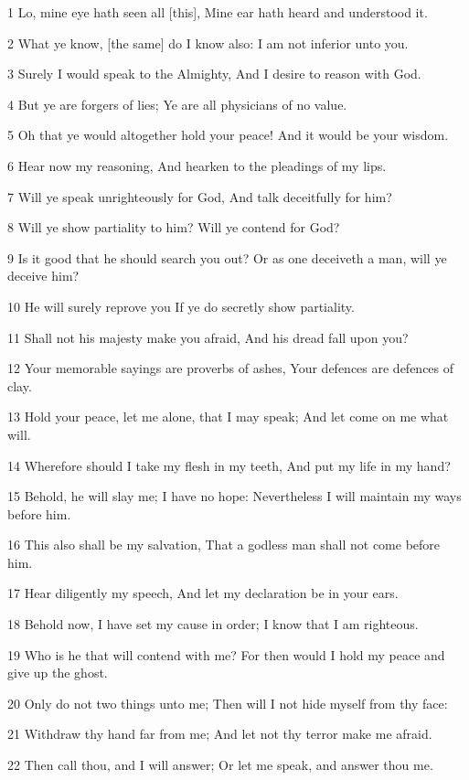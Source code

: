 \par 1 Lo, mine eye hath seen all [this], Mine ear hath heard and understood it.
\par 2 What ye know, [the same] do I know also: I am not inferior unto you.
\par 3 Surely I would speak to the Almighty, And I desire to reason with God.
\par 4 But ye are forgers of lies; Ye are all physicians of no value.
\par 5 Oh that ye would altogether hold your peace! And it would be your wisdom.
\par 6 Hear now my reasoning, And hearken to the pleadings of my lips.
\par 7 Will ye speak unrighteously for God, And talk deceitfully for him?
\par 8 Will ye show partiality to him? Will ye contend for God?
\par 9 Is it good that he should search you out? Or as one deceiveth a man, will ye deceive him?
\par 10 He will surely reprove you If ye do secretly show partiality.
\par 11 Shall not his majesty make you afraid, And his dread fall upon you?
\par 12 Your memorable sayings are proverbs of ashes, Your defences are defences of clay.
\par 13 Hold your peace, let me alone, that I may speak; And let come on me what will.
\par 14 Wherefore should I take my flesh in my teeth, And put my life in my hand?
\par 15 Behold, he will slay me; I have no hope: Nevertheless I will maintain my ways before him.
\par 16 This also shall be my salvation, That a godless man shall not come before him.
\par 17 Hear diligently my speech, And let my declaration be in your ears.
\par 18 Behold now, I have set my cause in order; I know that I am righteous.
\par 19 Who is he that will contend with me? For then would I hold my peace and give up the ghost.
\par 20 Only do not two things unto me; Then will I not hide myself from thy face:
\par 21 Withdraw thy hand far from me; And let not thy terror make me afraid.
\par 22 Then call thou, and I will answer; Or let me speak, and answer thou me.
